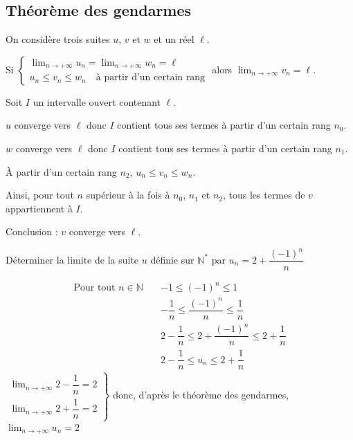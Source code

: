 \documentclass[french]{book}
\newcommand{\N}{\mathbb {N}}
\newcommand{\ie}{\leq}
\newcommand{\limn}{\lim_{n\rightarrow +\infty}}
\begin{document}
\subsection{Théorème des gendarmes}

\begin{prop}
On considère trois suites $u$, $v$ et $w$ et un réel $\ell$.
\par Si \quad
$\left\{\begin{array}{l}
\limn u_{n}=\limn w_{n}=\ell \\
u_{n} \ie v_{n} \ie w_{n} \quad \text{à partir d'un certain rang}
\end{array}\right.
$
\qquad alors \quad $\limn v_{n}=\ell$.
\end{prop}

\begin{demo}
Soit $I$ un intervalle ouvert contenant $\ell$.
\par $u$ converge vers $\ell$ donc $I$ contient tous ses termes à partir d'un certain rang $n_{0}$.
\par $w$ converge vers $\ell$ donc $I$ contient tous ses termes à partir d'un certain rang $n_{1}$.
\par À partir d'un certain rang $n_{2}$, $u_{n} \ie v_{n} \ie w_{n}$.
\par Ainsi, pour tout $n$ supérieur à la fois à $n_{0}$, $n_{1}$ et $n_{2}$, tous les termes de $v$ appartiennent à $I$.
\par Conclusion : $v$ converge vers $\ell$.
\end{demo}

\newpage
\begin{exemple}
Déterminer la limite de la suite $u$ définie sur $\N^{*}$ par $u_{n}=2+\dfrac{(-1)^{n}}{n}$
\end{exemple}

\begin{align*}
\text{Pour tout } n \in \N \quad
&-1 \ie (-1)^n \ie 1 \\
&-\dfrac{1}{n} \ie \dfrac{(-1)^{n}}{n} \ie \dfrac{1}{n}\\
&2-\dfrac{1}{n} \ie 2+\dfrac{(-1)^{n}}{n} \ie 2+\dfrac{1}{n}\\
&2-\dfrac{1}{n} \ie u_n \ie 2+\dfrac{1}{n}
\end{align*}
$\left.\begin{array}{l}
\limn 2-\dfrac{1}{n}=2\\
\limn 2+\dfrac{1}{n}=2
\end{array}\right\}$
donc, d'après le théorème des gendarmes, $\limn u_n=2$
\end{document}
